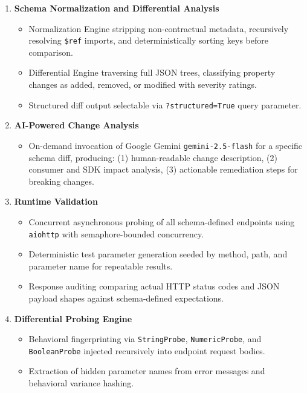 \documentclass{fisatprojectfinal}
\begin{document}
\begin{enumerate}
    \item \textbf{Schema Normalization and Differential Analysis}
    \begin{itemize}
        \item Normalization Engine stripping non-contractual metadata, recursively resolving \texttt{\$ref} imports, and deterministically sorting keys before comparison.
        \item Differential Engine traversing full JSON trees, classifying property changes as added, removed, or modified with severity ratings.
        \item Structured diff output selectable via \texttt{?structured=True} query parameter.
    \end{itemize}

    \item \textbf{AI-Powered Change Analysis}
    \begin{itemize}
        \item On-demand invocation of Google Gemini \texttt{gemini-2.5-flash} for a specific schema diff, producing: (1) human-readable change description, (2) consumer and SDK impact analysis, (3) actionable remediation steps for breaking changes.
    \end{itemize}

    \item \textbf{Runtime Validation}
    \begin{itemize}
        \item Concurrent asynchronous probing of all schema-defined endpoints using \texttt{aiohttp} with semaphore-bounded concurrency.
        \item Deterministic test parameter generation seeded by method, path, and parameter name for repeatable results.
        \item Response auditing comparing actual HTTP status codes and JSON payload shapes against schema-defined expectations.
    \end{itemize}

    \item \textbf{Differential Probing Engine}
    \begin{itemize}
        \item Behavioral fingerprinting via \texttt{StringProbe}, \texttt{NumericProbe}, and \texttt{BooleanProbe} injected recursively into endpoint request bodies.
        \item Extraction of hidden parameter names from error messages and behavioral variance hashing.
    \end{itemize}
\end{enumerate}
\end{document}
